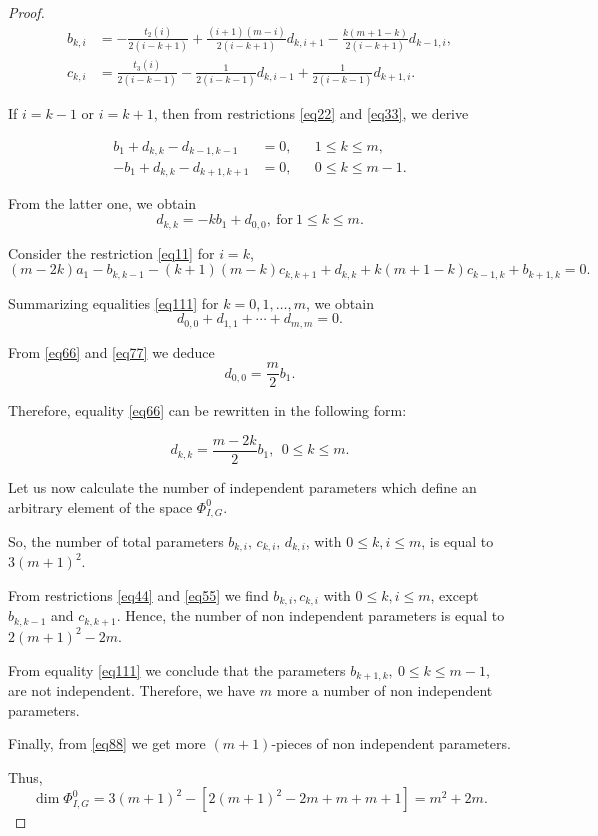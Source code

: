\documentclass[12pt,reqno]{amsart}
\numberwithin{equation}{section}
\begin{document}
\begin{proof}
\begin{align}
b_{k,i} & =-\frac{t_2(i)}{2(i-k+1)}+\frac{(i+1)(m-i)}{2(i-k+1)}d_{k,i+1}-\frac{k(m+1-k)}{2(i-k+1)}d_{k-1,i}, \label{eq44} \\
c_{k,i} & =\frac{t_3(i)}{2(i-k-1)}-\frac{1}{2(i-k-1)}d_{k,i-1}+\frac{1}{2(i-k-1)}d_{k+1,i}. \label{eq55}
\end{align}

If $i=k-1$ or $i=k+1$, then
from restrictions \eqref{eq22} and \eqref{eq33}, we derive

\begin{align*}
b_{1}+d_{k,k}-d_{k-1,k-1} & =0, && 1\leq k\leq m,\\
-b_{1}+d_{k,k}-d_{k+1,k+1} & =0, && 0\leq k\leq m-1.
\end{align*}

From the latter one, we obtain
\begin{equation} \label{eq66}
d_{k,k}=-kb_{1}+d_{0,0}, \ \text{for} \ 1\leq k\leq m.
\end{equation}

Consider  the restriction \eqref{eq11} for $i=k$,
\begin{equation} \label{eq111}
(m-2k)a_{1}-b_{k,k-1}-(k+1)(m-k)c_{k,k+1}+d_{k,k}+k(m+1-k)c_{k-1,k}+b_{k+1,k}=0.
\end{equation}

Summarizing equalities \eqref{eq111} for $k=0, 1, \dots, m$, we obtain
\begin{equation} \label{eq77}
d_{0,0}+d_{1,1}+\cdots+d_{m,m}=0.
\end{equation}

From \eqref{eq66} and \eqref{eq77} we deduce
\[d_{0,0}=\frac{m}{2}b_{1}.\]

Therefore, equality \eqref{eq66} can be rewritten in the following form:

\begin{equation} \label{eq88}
d_{k,k}=\frac{m-2k}{2}b_{1}, \ \ 0\leq k\leq m.
\end{equation}

Let us now calculate the number of independent parameters which define an arbitrary element of the space $\Phi_{I,G}^{0}$.

So, the number of total parameters $b_{k,i}, \, c_{k,i}, \, d_{k,i}$, with $0\leq k,i\leq m$, is equal to $3(m+1)^2$.

From restrictions \eqref{eq44} and \eqref{eq55} we find $b_{k,i},
c_{k,i}$ with $0\leq k,i\leq m$, except  $b_{k,k-1}$ and
$c_{k,k+1}$. Hence, the number of non independent parameters is
equal to $2(m+1)^2-2m$.

From equality \eqref{eq111} we conclude that the parameters $b_{k+1,k}, \ 0\leq k\leq m-1$, are not independent.
 Therefore, we have $m$ more a number of non independent parameters.

Finally, from \eqref{eq88} we get more $(m+1)$-pieces of non independent parameters.

Thus,
\[\dim \Phi_{I,G}^{0}=3(m+1)^2-\left[2(m+1)^2-2m+m+m+1\right]=m^2+2m.\]
\end{proof}
\end{document}

